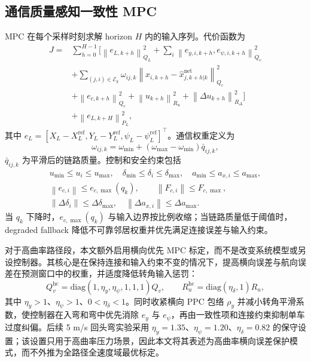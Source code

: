 \documentclass[twocolumn,3p,times,procedia]{elsarticle}
\newcommand{\norm}[1]{\left\lVert #1 \right\rVert}
\begin{document}
\subsection{通信质量感知一致性 MPC}

MPC 在每个采样时刻求解 horizon $H$ 内的输入序列。代价函数为
\begin{equation}
\begin{aligned}
J=&\sum_{h=0}^{H-1}
\Big[
\norm{e_{L,k+h}}_{Q_L}^2+
\sum_i\norm{e_{y,i,k+h},e_{\psi,i,k+h}}_{Q_v}^2\\
&+\sum_{(j,i)\in\mathcal E_k}\omega_{ij,k}\norm{x_{i,k+h}-\hat x_{j,k+h|k}^{\mathrm{net}}}_{Q_c}^2\\
&+\norm{e_{c,k+h}}_{Q_e}^2+
\norm{u_{k+h}}_{R_u}^2+
\norm{\Delta u_{k+h}}_{R_\Delta}^2
\Big]\\
&+\norm{e_{L,k+H}}_{P_L}^2 ,
\end{aligned}
\label{eq:mpc_cost}
\end{equation}
其中 $e_L=[X_L-X_L^{\mathrm{ref}},Y_L-Y_L^{\mathrm{ref}},\psi_L-\psi_L^{\mathrm{ref}}]^\top$。通信权重定义为
\begin{equation}
\omega_{ij,k}=\omega_{\min}+(\omega_{\max}-\omega_{\min})\bar q_{ij,k},
\label{eq:comm_weight}
\end{equation}
$\bar q_{ij,k}$ 为平滑后的链路质量。控制和安全约束包括
\begin{equation}
\begin{gathered}
u_{\min}\le u_i\le u_{\max},\quad
\delta_{\min}\le\delta_i\le\delta_{\max},\quad
a_{\min}\le a_{x,i}\le a_{\max},\\
\norm{e_{c,i}}\le e_{c,\max}(q_k),\qquad
\norm{F_{c,i}}\le F_{c,\max},\\
\norm{\Delta \delta_i}\le \Delta\delta_{\max},\quad
\norm{\Delta a_{x,i}}\le \Delta a_{\max}.
\end{gathered}
\label{eq:constraints}
\end{equation}
当 $q_k$ 下降时，$e_{c,\max}(q_k)$ 与输入边界按比例收缩；当链路质量低于阈值时，degraded fallback 降低不可靠邻居权重并优先满足连接误差与输入约束。

对于高曲率路径段，本文额外启用横向优先 MPC 标定，而不是改变系统模型或另设控制器。其核心是在保持连接和输入约束不变的情况下，提高横向误差与航向误差在预测窗口中的权重，并适度降低转角输入惩罚：
\begin{equation}
Q_v^{\mathrm{hc}}=\mathrm{diag}(1,\eta_y,\eta_\psi,1,1,1)Q_v,\qquad
R_u^{\mathrm{hc}}=\mathrm{diag}(\eta_\delta,1)R_u ,
\label{eq:high_curvature_lateral_priority}
\end{equation}
其中 $\eta_y>1$、$\eta_\psi>1$、$0<\eta_\delta<1$。同时收紧横向 PPC 包络 $\rho_y$ 并减小转角平滑系数，使控制器在入弯和弯中优先消除 $e_y$ 与 $e_\psi$，再由一致性项和连接约束抑制单车过度纠偏。后续 5 m/s 回头弯实验采用 $\eta_y=1.35$、$\eta_\psi=1.20$、$\eta_\delta=0.82$ 的保守设置；该设置只用于高曲率压力场景，因此本文将其表述为高曲率横向误差保护模式，而不外推为全路径全速度域最优标定。
\end{document}
